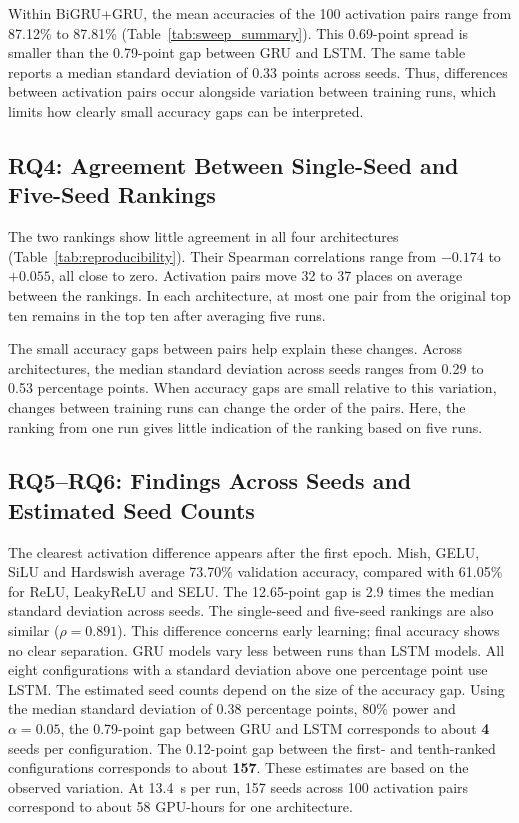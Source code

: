\documentclass[conference,a4paper]{IEEEtran}
\begin{document}
Within BiGRU+GRU, the mean accuracies of the 100 activation
pairs range from 87.12\% to 87.81\%
(Table~\ref{tab:sweep_summary}). This 0.69-point spread is
smaller than the 0.79-point gap between GRU and LSTM.
The same table reports a median standard deviation of
0.33 points across seeds. Thus, differences between
activation pairs occur alongside variation between training
runs, which limits how clearly small accuracy gaps can
be interpreted.
\subsection{RQ4: Agreement Between Single-Seed and Five-Seed Rankings}

The two rankings show little agreement in all four architectures
(Table~\ref{tab:reproducibility}). Their Spearman correlations range
from $-0.174$ to $+0.055$, all close to zero. Activation pairs move
32 to 37 places on average between the rankings. In each
architecture, at most one pair from the original top ten remains
in the top ten after averaging five runs.

The small accuracy gaps between pairs help explain these changes.
Across architectures, the median standard deviation across seeds
ranges from 0.29 to 0.53 percentage points. When accuracy gaps are
small relative to this variation, changes between training runs
can change the order of the pairs. Here, the ranking from one run
gives little indication of the ranking based on five runs.

\subsection{RQ5--RQ6: Findings Across Seeds and Estimated Seed Counts}
\label{sec:rq6}

The clearest activation difference appears after the first epoch.
Mish, GELU, SiLU and Hardswish average 73.70\% validation accuracy,
compared with 61.05\% for ReLU, LeakyReLU and SELU. The 12.65-point
gap is 2.9 times the median standard deviation across seeds.
The single-seed and five-seed rankings are also similar
($\rho=0.891$). This difference concerns early learning; final
accuracy shows no clear separation. GRU models vary less between
runs than LSTM models. All eight configurations with a standard
deviation above one percentage point use LSTM.
The estimated seed counts depend on the size of the accuracy gap.
Using the median standard deviation of 0.38 percentage points,
80\% power and $\alpha=0.05$, the 0.79-point gap between GRU and
LSTM corresponds to about \textbf{4} seeds per configuration.
The 0.12-point gap between the first- and tenth-ranked
configurations corresponds to about \textbf{157}. These estimates
are based on the observed variation. At 13.4~s per run, 157 seeds
across 100 activation pairs correspond to about 58 GPU-hours
for one architecture.
\end{document}
